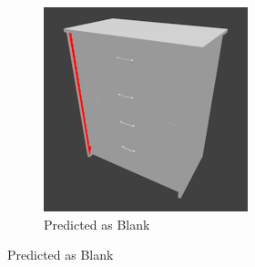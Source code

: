 \begin{figure}
	\begin{subfigure}{.3\textwidth}
		\centering
		\includegraphics[width=.8\textwidth]{images/dresser_0215_2_010.png}
		\caption{Predicted as Blank}
		\label{fig:small-features-c}
	\end{subfigure}
	

\end{figure}
